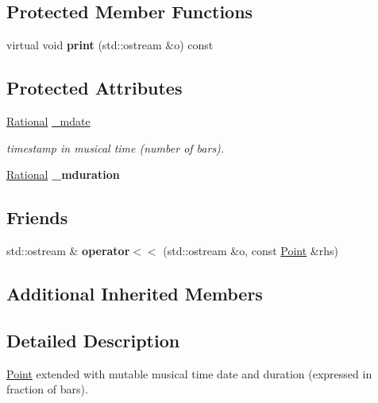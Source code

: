 \subsection*{Protected Member Functions}
\begin{DoxyCompactItemize}
\item 
virtual void {\bfseries print} (std\+::ostream \&o) const
\end{DoxyCompactItemize}
\subsection*{Protected Attributes}
\begin{DoxyCompactItemize}
\item 
\mbox{\label{classMusPoint_a5e678087e524bfa4e1d3612016196a9c}} 
\mbox{\hyperlink{classRational}{Rational}} \mbox{\hyperlink{classMusPoint_a5e678087e524bfa4e1d3612016196a9c}{\+\_\+mdate}}
\begin{DoxyCompactList}\small\item\em timestamp in musical time (number of bars). \end{DoxyCompactList}\item 
\mbox{\label{classMusPoint_a8d5382b9ab148a21ae7adc52b788b15f}} 
\mbox{\hyperlink{classRational}{Rational}} {\bfseries \+\_\+mduration}
\end{DoxyCompactItemize}
\subsection*{Friends}
\begin{DoxyCompactItemize}
\item 
\mbox{\label{classMusPoint_ad95cc714e40b63c5df8e1dc41305178e}} 
std\+::ostream \& {\bfseries operator$<$$<$} (std\+::ostream \&o, const \mbox{\hyperlink{classPoint}{Point}} \&rhs)
\end{DoxyCompactItemize}
\subsection*{Additional Inherited Members}


\subsection{Detailed Description}
\mbox{\hyperlink{classPoint}{Point}} extended with mutable musical time date and duration (expressed in fraction of bars). 

